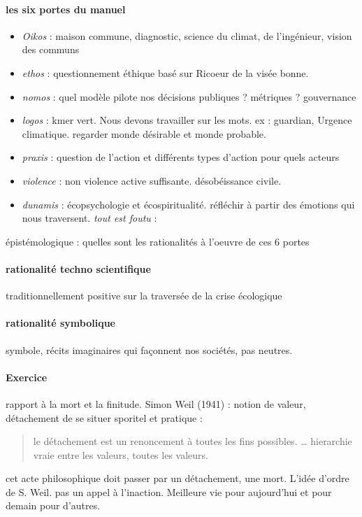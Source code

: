 \paragraph{les six portes du manuel}
\begin{itemize}
    \item \textit{Oikos} : maison commune, diagnostic, science du climat, de l'ingénieur, vision des communs
    \item \textit{ethos} : questionnement éthique basé sur Ricoeur de la visée bonne.
    \item \textit{nomos} : quel modèle pilote nos décisions publiques ? métriques ? gouvernance
    \item \textit{logos} : kmer vert. Nous devons travailler sur les mots. ex : guardian, Urgence climatique. regarder monde désirable et monde probable.
    \item \textit{praxis} : question de l'action et différents types d'action pour quels acteurs
    \item \textit{violence} : non violence active suffisante. désobéissance civile. 
    \item \textit{dunamis} : écopsychologie et écospiritualité. réfléchir à partir des émotions qui nous traversent.  \textit{tout est foutu} :  
\end{itemize}

épistémologique : quelles sont les rationalités à l'oeuvre de ces 6 portes

\paragraph{rationalité techno scientifique} traditionnellement positive sur la traversée de la crise écologique

\paragraph{rationalité symbolique} symbole, récits imaginaires qui façonnent nos sociétés, pas neutres.

\paragraph{Exercice} rapport à la mort et la finitude. Simon Weil (1941) : notion de valeur, détachement de se situer sporitel et pratique :
\begin{quote}
    le détachement est un renoncement à toutes les fins possibles.
    \ldots
    hierarchie vraie entre les valeurs, toutes les valeurs. 
    
\end{quote}
 cet acte philosophique doit passer par un détachement, une mort. L'idée d'ordre de S. Weil. 
 pas un appel à l'inaction. Meilleure vie pour aujourd'hui et pour demain pour d'autres.

